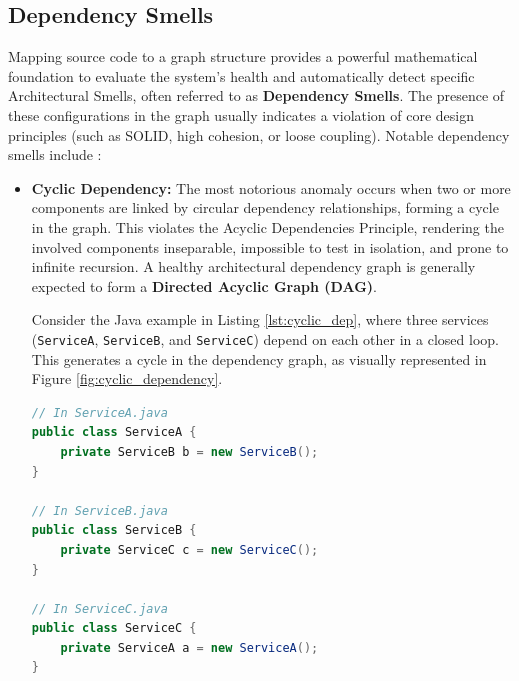 \subsection{Dependency Smells}
Mapping source code to a graph structure provides a powerful
mathematical foundation to evaluate the system's health and
automatically detect specific Architectural Smells, often referred
to as \textbf{Dependency Smells}. The presence of these
configurations in the graph usually indicates a violation of core
design principles (such as SOLID, high cohesion, or loose coupling).
Notable dependency smells include \cite{noauthor_arcan_nodate}:

\begin{itemize}
  \item \textbf{Cyclic Dependency:} The most notorious anomaly occurs
    when two or more components are linked by circular dependency
    relationships, forming a cycle in the graph. This violates the
    Acyclic Dependencies Principle, rendering the involved components
    inseparable, impossible to test in isolation, and prone to
    infinite recursion. A healthy architectural dependency graph is
    generally expected to form a \textbf{Directed Acyclic Graph (DAG)}.

    Consider the Java example in Listing \ref{lst:cyclic_dep}, where
    three services (\texttt{ServiceA}, \texttt{ServiceB}, and \texttt{ServiceC})
    depend on each other in a closed loop. This generates a cycle in
    the dependency graph, as visually represented in Figure
    \ref{fig:cyclic_dependency}.

\begin{lstlisting}[language=Java,caption={Example of a Cyclic Dependency involving three Java services.},label={lst:cyclic_dep}]
// In ServiceA.java
public class ServiceA {
    private ServiceB b = new ServiceB();
}

// In ServiceB.java
public class ServiceB {
    private ServiceC c = new ServiceC();
}

// In ServiceC.java
public class ServiceC {
    private ServiceA a = new ServiceA();
}
\end{lstlisting}


\end{itemize}

